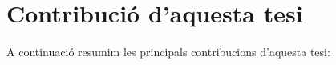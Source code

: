 











\section{Contribució d'aquesta tesi}


A continuació resumim les principals contribucions d'aquesta tesi:

